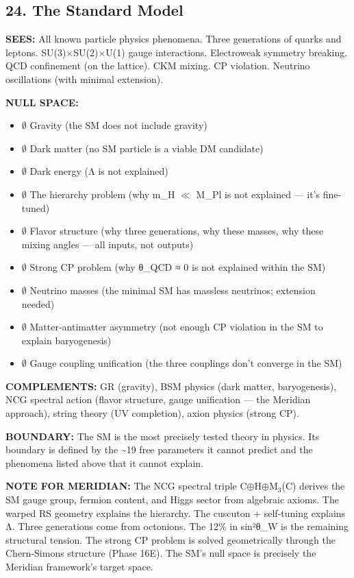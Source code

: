 \bigskip\noindent\makebox[\textwidth]{\color{rulegray}\rule{5cm}{0.3pt}}\bigskip


\subsection*{24. The Standard Model}


\textbf{SEES:} All known particle physics phenomena. Three generations of quarks and leptons. SU(3)×SU(2)×U(1) gauge interactions. Electroweak symmetry breaking. QCD confinement (on the lattice). CKM mixing. CP violation. Neutrino oscillations (with minimal extension).


\textbf{NULL SPACE:}

\begin{itemize}[nosep,leftmargin=*]
  \item $\emptyset$ Gravity (the SM does not include gravity)
  \item $\emptyset$ Dark matter (no SM particle is a viable DM candidate)
  \item $\emptyset$ Dark energy (Λ is not explained)
  \item $\emptyset$ The hierarchy problem (why m\_H $\ll$ M\_Pl is not explained — it's fine-tuned)
  \item $\emptyset$ Flavor structure (why three generations, why these masses, why these mixing angles — all inputs, not outputs)
  \item $\emptyset$ Strong CP problem (why θ\_QCD ≈ 0 is not explained within the SM)
  \item $\emptyset$ Neutrino masses (the minimal SM has massless neutrinos; extension needed)
  \item $\emptyset$ Matter-antimatter asymmetry (not enough CP violation in the SM to explain baryogenesis)
  \item $\emptyset$ Gauge coupling unification (the three couplings don't converge in the SM)
\end{itemize}


\textbf{COMPLEMENTS:} GR (gravity), BSM physics (dark matter, baryogenesis), NCG spectral action (flavor structure, gauge unification — the Meridian approach), string theory (UV completion), axion physics (strong CP).


\textbf{BOUNDARY:} The SM is the most precisely tested theory in physics. Its boundary is defined by the \textasciitilde{}19 free parameters it cannot predict and the phenomena listed above that it cannot explain.


\textbf{NOTE FOR MERIDIAN:} The NCG spectral triple C$\oplus$H$\oplus$M$_3$(C) derives the SM gauge group, fermion content, and Higgs sector from algebraic axioms. The warped RS geometry explains the hierarchy. The cuscuton + self-tuning explains Λ. Three generations come from octonions. The 12\% in sin²θ\_W is the remaining structural tension. The strong CP problem is solved geometrically through the Chern-Simons structure (Phase 16E). The SM's null space is precisely the Meridian framework's target space.


